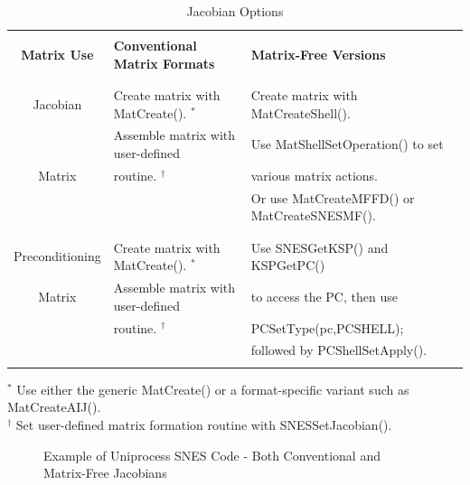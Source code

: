 \begin{center}
\begin{table}[H]
\begin{tabular}{|c|l|l|} \hline
& & \\
{\bf Matrix Use}      & {\bf Conventional Matrix Formats}          & {\bf Matrix-Free Versions}\\
& & \\ \hline
& & \\
Jacobian        & Create matrix with MatCreate(). $ ^* $ & Create matrix with MatCreateShell().\\
               & Assemble matrix with user-defined     & Use MatShellSetOperation() to set\\
Matrix          & routine. $ ^\dagger $                         & various matrix actions.\\
                &                                    & Or use MatCreateMFFD() or MatCreateSNESMF().\\
& & \\ \hline
& & \\
Preconditioning  & Create matrix with MatCreate(). $ ^* $ & Use SNESGetKSP() and KSPGetPC() \\
Matrix           & Assemble matrix with user-defined & to access the PC, then use\\
                & routine. $ ^\dagger $         & PCSetType(pc,PCSHELL);\\
                &             & followed by PCShellSetApply(). \\

& & \\ \hline
\end{tabular}

\medskip
$ ^* $ Use either the generic MatCreate() or a format-specific variant
   such as MatCreateAIJ().\\
$ ^\dagger $ Set user-defined matrix formation routine with SNESSetJacobian().
\medskip
\caption{Jacobian Options}
\label{tab_jacobians}
\end{table}
\end{center}

\begin{figure}[H]
{\small
{}
}
\caption{Example of Uniprocess SNES Code - Both Conventional and Matrix-Free Jacobians}
\label{fig_snesexample2}
\end{figure}

